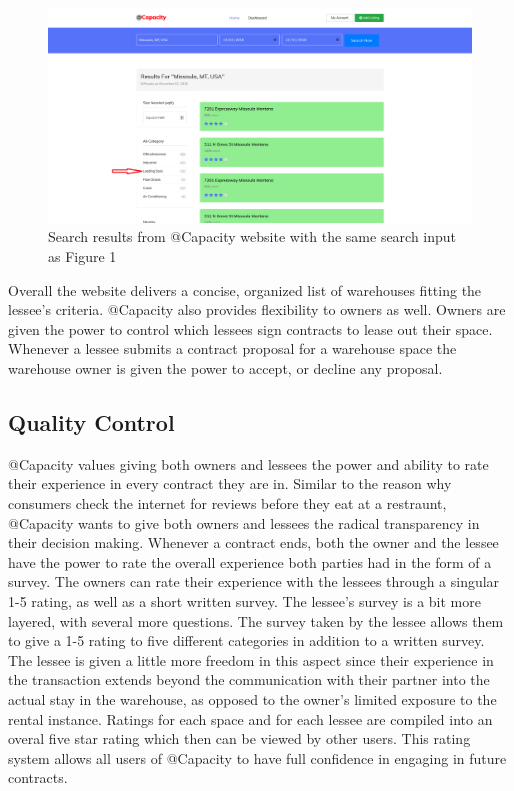 \begin{figure}[tbh]
\centering
\includegraphics[width=.75\textwidth]{Phase_3/loading}
\caption{Search results from @Capacity website with the same search input as Figure 1}
\label{fig:loading}
\end{figure} 

Overall the website delivers a concise, organized list of warehouses fitting the lessee's criteria. @Capacity also provides flexibility to owners as well. Owners are given the power to control which lessees sign contracts to lease out their space. Whenever a lessee submits a contract proposal for a warehouse space the warehouse owner is given the power to accept, or decline any proposal.

  
\subsection{Quality Control}
@Capacity values giving both owners and lessees the power and ability to rate their experience in every contract they are in. Similar to the reason why consumers check the internet for reviews before they eat at a restraunt, @Capacity wants to give both owners and lessees the radical transparency in their decision making. Whenever a contract ends, both the owner and the lessee have the power to rate the overall experience both parties had in the form of a survey. The owners can rate their experience with the lessees through a singular 1-5 rating, as well as a short written survey. The lessee's survey is a bit more layered, with several more questions. The survey taken by the lessee allows them to give a 1-5 rating to five different categories in addition to a written survey. The lessee is given a little more freedom in this aspect since their experience in the transaction extends beyond the communication with their partner into the actual stay in the warehouse, as opposed to the owner's limited exposure to the rental instance. Ratings for each space and for each lessee are compiled into an overal five star rating which then can be viewed by other users. This rating system allows all users of @Capacity to have full confidence in engaging in future contracts.
